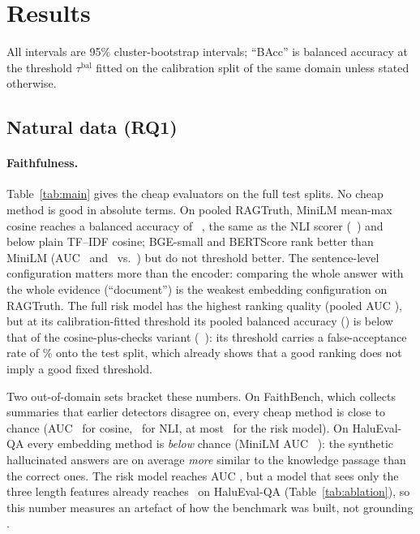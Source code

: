 \section{Results}
\label{sec:results}

All intervals are 95\% cluster-bootstrap intervals; ``BAcc'' is balanced accuracy at the threshold $\tau^\mathrm{bal}$ fitted on the calibration split of the same domain unless stated otherwise.

\subsection{Natural data (RQ1)}
\label{sec:res-natural}

\begin{table}[t]
\centering\small
\setlength{\tabcolsep}{3.2pt}
\resizebox{\textwidth}{!}{}
\caption{Evidence-grounded faithfulness on the full test splits. AUC treats \emph{unsupported} as the positive class; BAcc at the calibration-fitted $\tau^\mathrm{bal}$. ``RAGTruth pooled'' uses per-task thresholds and pools the \NTestRagtruth\ RAGTruth test examples. Bold: best per column. HaluEval-QA labels are synthetic.}
\label{tab:main}
\end{table}

\paragraph{Faithfulness.} Table~\ref{tab:main} gives the cheap evaluators on the full test splits. No cheap method is good in absolute terms. On pooled RAGTruth, MiniLM mean-max cosine reaches a balanced accuracy of \PoolCosBacc\ \PoolCosBaccCi, the same as the NLI scorer (\PoolNliBacc\ \PoolNliBaccCi) and below plain TF--IDF cosine; BGE-small and BERTScore rank better than MiniLM (AUC \PoolBgeAuc\ and \PoolBertAuc\ vs.\ \PoolCosAuc) but do not threshold better. The sentence-level configuration matters more than the encoder: comparing the whole answer with the whole evidence (``document'') is the weakest embedding configuration on RAGTruth. The full risk model has the highest ranking quality (pooled AUC \PoolRiskAuc), but at its calibration-fitted threshold its pooled balanced accuracy (\PoolRiskBacc) is below that of the cosine-plus-checks variant (\PoolRiskChkBacc\ \PoolRiskChkBaccCi): its threshold carries a false-acceptance rate of \PoolRiskFar\% onto the test split, which already shows that a good ranking does not imply a good fixed threshold.

Two out-of-domain sets bracket these numbers. On FaithBench, which collects summaries that earlier detectors disagree on, every cheap method is close to chance (AUC \FbCosAuc\ for cosine, \FbNliAuc\ for NLI, at most \FbRiskAuc\ for the risk model). On HaluEval-QA every embedding method is \emph{below} chance (MiniLM AUC \HaluCosAuc\ \HaluCosAucCi): the synthetic hallucinated answers are on average \emph{more} similar to the knowledge passage than the correct ones. The risk model reaches AUC \HaluRiskAuc, but a model that sees only the three length features already reaches \AblOnlyLengthHaluAuc\ on HaluEval-QA (Table~\ref{tab:ablation}), so this number measures an artefact of how the benchmark was built, not grounding \citep{hussain2026parallax}.

